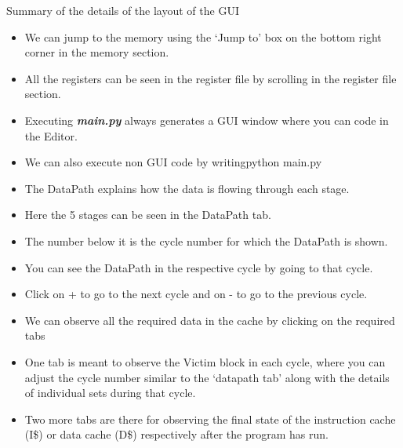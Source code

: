\documentclass{article}
\begin{document}
\newpage
\begin{centering}
\begin{Huge}
\textsf{Summary of the details of the layout of the GUI}\\
\end{Huge}
\vspace{0.6cm}
\end{centering}


\begin{itemize}
    \item We can jump to the memory using the `Jump to' box on the bottom right corner in the memory section.
    \item All the registers can be seen in the register file by scrolling in the register file section.
    \item Executing \textsl{\textbf{main.py}} always generates a GUI window where you can code in the Editor.
    \item We can also execute non GUI code by writing\textrightarrow   python main.py
    \item The DataPath explains how the data is flowing through each stage.
    \item Here the 5 stages can be seen in the DataPath tab.
    \item The number below it is the cycle number for which the DataPath is shown.
    \item You can see the DataPath in the respective cycle by going to that cycle.
    \item Click on + to go to the next cycle and on - to go to the previous cycle.
    \item We can observe all the required data in the cache by clicking on the required tabs
    \item One tab is meant to observe the Victim block in each cycle, where you can adjust the cycle number similar to the `datapath tab' along with the details of individual sets during that cycle.
    \item Two more tabs are there for observing the final state of the instruction cache (I\$) or data cache (D\$) respectively after the program has run.
\end{itemize}
\end{document}
